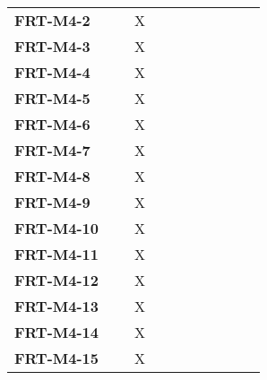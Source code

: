 \documentclass[12pt, titlepage]{article}
\begin{document}
\begin{longtable}{|l|ccccccc|}
	\textbf{FRT-M4-2}  & ~                                        & X           & ~           & ~           & ~           & ~           & ~           \\
	\textbf{FRT-M4-3}  & ~                                        & X           & ~           & ~           & ~           & ~           & ~           \\
	\textbf{FRT-M4-4}  & ~                                        & X           & ~           & ~           & ~           & ~           & ~           \\
	\textbf{FRT-M4-5}  & ~                                        & X           & ~           & ~           & ~           & ~           & ~           \\
	\textbf{FRT-M4-6}  & ~                                        & X           & ~           & ~           & ~           & ~           & ~           \\
	\textbf{FRT-M4-7}  & ~                                        & X           & ~           & ~           & ~           & ~           & ~           \\
	\textbf{FRT-M4-8}  & ~                                        & X           & ~           & ~           & ~           & ~           & ~           \\
	\textbf{FRT-M4-9}  & ~                                        & X           & ~           & ~           & ~           & ~           & ~           \\
	\textbf{FRT-M4-10} & ~                                        & X           & ~           & ~           & ~           & ~           & ~           \\
	\textbf{FRT-M4-11} & ~                                        & X           & ~           & ~           & ~           & ~           & ~           \\
	\textbf{FRT-M4-12} & ~                                        & X           & ~           & ~           & ~           & ~           & ~           \\
	\textbf{FRT-M4-13} & ~                                        & X           & ~           & ~           & ~           & ~           & ~           \\
	\textbf{FRT-M4-14} & ~                                        & X           & ~           & ~           & ~           & ~           & ~           \\
	\textbf{FRT-M4-15} & ~                                        & X           & ~           & ~           & ~           & ~           & ~           \\

\end{longtable}
\end{document}

